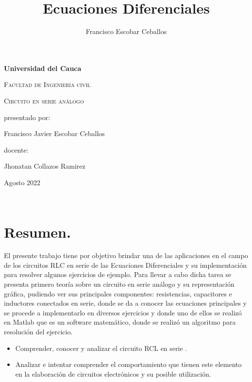 \documentclass[12pt,a4paper]{article}
\author{Francisco Escobar Ceballos }
\title{Ecuaciones Diferenciales}
\begin{document}
\begin{titlepage}
\centering
{\bfseries\LARGE Universidad del Cauca}\\
\vspace{1cm}
{\scshape\Large Facultad de Ingenier\'ia civil \par}
\vspace{3cm}
{\scshape\Huge Circuito en serie análogo \par}
\vspace{3cm}
\vfill
{\Large presentado por: \par}
{\Large Francisco Javier Escobar Ceballos \par}
\vfill
{\Large docente: \par}
{\Large Jhonatan Collazos Ramirez \par}
\vfill
{\Large Agosto 2022 \par}
\end{titlepage}
\maketitle\

\section{ Resumen.}
El presente trabajo tiene por objetivo brindar una de las aplicaciones en el campo de los circuitos RLC en serie de las Ecuaciones Diferenciales y su implementación para resolver algunos ejercicios de ejemplo. Para llevar a cabo dicha tarea se presenta primero teoría sobre un circuito en serie análogo y su representación gráfica, pudiendo ver sus principales componentes: resistencias, capacitores e inductores conectados en serie, donde se da a conocer las ecuaciones principales y se procede a implementarlo en diversos ejercicios y donde uno de ellos se realizó en Matlab que es un software matemático, donde se realizó un algoritmo para resolución del ejercicio.
\begin{itemize}
\item  Comprender, conocer y analizar el circuito RCL en serie . 
\item Analizar e intentar comprender el comportamiento que tienen este elemento  en la elaboración de circuitos electrónicos y su posible utilización.
\end{itemize}
\end{document}
